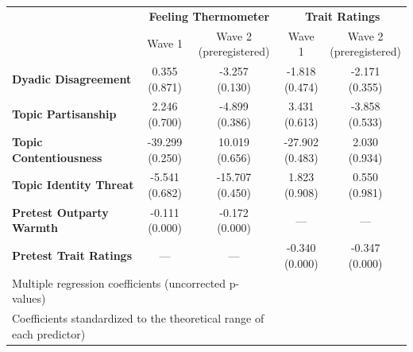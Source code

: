 \begin{tabular}{lcccc}
\hline
\multirow{2}{*}{~} & \multicolumn{2}{c}{\textbf{Feeling Thermometer}} & \multicolumn{2}{c}{\textbf{Trait Ratings}} \\
 & Wave 1 & \makecell{Wave 2 \\ (preregistered)} & Wave 1 & \makecell{Wave 2 \\ (preregistered)} \\
\hline

\textbf{Dyadic Disagreement} & \makecell{0.355 \\ (0.871)} & \makecell{-3.257 \\ (0.130)} & \makecell{-1.818 \\ (0.474)} & \makecell{-2.171 \\ (0.355)} \\
\textbf{Topic Partisanship} & \makecell{2.246 \\ (0.700)} & \makecell{-4.899 \\ (0.386)} & \makecell{3.431 \\ (0.613)} & \makecell{-3.858 \\ (0.533)} \\
\textbf{Topic Contentiousness} & \makecell{-39.299 \\ (0.250)} & \makecell{10.019 \\ (0.656)} & \makecell{-27.902 \\ (0.483)} & \makecell{2.030 \\ (0.934)} \\
\textbf{Topic Identity Threat} & \makecell{-5.541 \\ (0.682)} & \makecell{-15.707 \\ (0.450)} & \makecell{1.823 \\ (0.908)} & \makecell{0.550 \\ (0.981)} \\
\textbf{Pretest Outparty Warmth} & \makecell{-0.111 \\ (0.000)} & \makecell{-0.172 \\ (0.000)} & — & — \\
\textbf{Pretest Trait Ratings} & — & — & \makecell{-0.340 \\ (0.000)} & \makecell{-0.347 \\ (0.000)} \\
\hline
 \multicolumn{3}{l}{\footnotesize Multiple regression coefficients (uncorrected p-values)}\\
 \multicolumn{3}{l}{\footnotesize Coefficients standardized to the theoretical range of each predictor)}\\
 \hline
\end{tabular}

